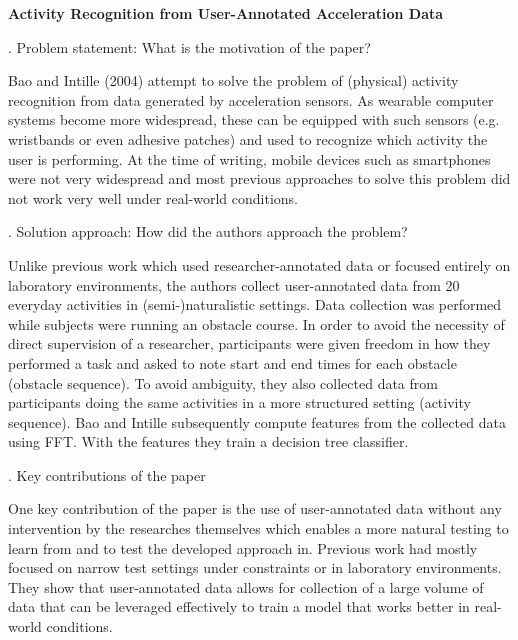\documentclass[12pt]{article}
\newenvironment{indentpar}
    {\vspace{0.25cm}\hfill\begin{minipage}{\dimexpr\textwidth-1cm}}
    {\end{minipage}\vspace{0.3cm}}
\begin{document}
 

{\Large\centering
    \textbf{Activity Recognition from User-Annotated Acceleration Data}
\par}

\bigskip

. Problem statement: What is the motivation of the paper?

\begin{indentpar}
Bao and Intille (2004) attempt to solve the problem of (physical) activity recognition from data generated by acceleration sensors. As wearable computer systems become more widespread, these can be equipped with such sensors (e.g. wristbands or even adhesive patches) and used to recognize which activity the user is performing. At the time of writing, mobile devices such as smartphones were not very widespread and most previous approaches to solve this problem did not work very well under real-world conditions.
\end{indentpar}


. Solution approach: How did the authors approach the problem?

\begin{indentpar}
Unlike previous work which used researcher-annotated data or focused entirely on laboratory environments, the authors collect user-annotated data from 20 everyday activities in (semi-)naturalistic settings. Data collection was performed while subjects were running an obstacle course. In order to avoid the necessity of direct supervision of a researcher, participants were given freedom in how they performed a task and asked to note start and end times for each obstacle (obstacle sequence). To avoid ambiguity, they also collected data from participants doing the same activities in a more structured setting (activity sequence). Bao and Intille subsequently compute features from the collected data using FFT. With the features they train a decision tree classifier.
\end{indentpar}

. Key contributions of the paper

\begin{indentpar}
One key contribution of the paper is the use of user-annotated data without any intervention by the researches themselves which enables a more natural testing to learn from and to test the developed approach in. Previous work had mostly focused on narrow test settings under constraints or in laboratory environments. They show that user-annotated data allows for collection of a large volume of data that can be leveraged effectively to train a model that works better in real-world conditions.
\end{indentpar}
\end{document}
